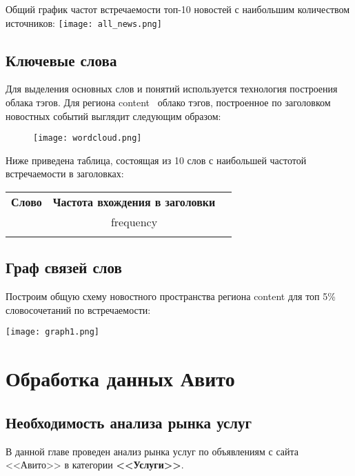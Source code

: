 \documentclass[a4paper,14pt]{extarticle}
\begin{document}
\newpage

Общий график частот встречаемости топ-10 новостей с наибольшим количеством источников:
\texttt{[image: all\_news.png]}

\newpage
\subsection{Ключевые слова}
Для выделения основных слов и понятий используется технология построения облака тэгов. Для региона {{ content }} облако тэгов, построенное по заголовком новостных событий выглядит следующим образом:

\begin{figure}[h!]
\centering
\texttt{[image: wordcloud.png]}
\end{figure}

\newpage
Ниже приведена таблица, состоящая из 10 слов с наибольшей частотой встречаемости в заголовках:

\begin{center}
\begin{tabular}{ |c|c|c| } 
 \hline
\textbf{Слово} & \textbf{Частота вхождения в заголовки} \\ 
{%
    \hline
    {{ word }} & {{ frequency }} \\
{%
 \hline
\end{tabular}
\end{center}

\newpage
\subsection{Граф связей слов}

Построим общую схему новостного пространства региона {{ content }} для топ 5\% словосочетаний по встречаемости:

\texttt{[image: graph1.png]}

\newpage

\section{Обработка данных Авито}

\subsection{Необходимость анализа рынка услуг}

В данной главе проведен анализ рынка услуг по объявлениям с сайта <<Авито>> в категории \textbf{<<Услуги>>}.
\end{document}
